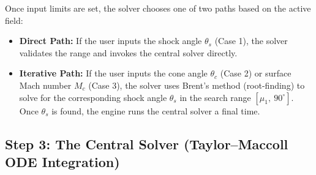 Once input limits are set, the solver chooses one of two paths based on the active field:
\begin{itemize}
    \item \textbf{Direct Path:} If the user inputs the shock angle $\theta_s$ (Case 1), the solver validates the range and invokes the central solver directly.
    \item \textbf{Iterative Path:} If the user inputs the cone angle $\theta_c$ (Case 2) or surface Mach number $M_c$ (Case 3), the solver uses Brent's method (root-finding) to solve for the corresponding shock angle $\theta_s$ in the search range $[\mu_1,\ 90^\circ]$. Once $\theta_s$ is found, the engine runs the central solver a final time.
\end{itemize}

\subsection*{Step 3: The Central Solver (Taylor--Maccoll ODE Integration)}

